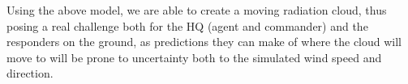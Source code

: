 Using the above model, we are able to create a moving radiation cloud, thus posing a real challenge both for the HQ (agent and commander) and the responders on the ground, as predictions they can make of where the cloud will move to will be prone to uncertainty both to the simulated wind speed and direction. 


%
